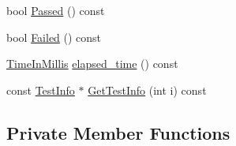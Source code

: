 \begin{DoxyCompactItemize}
\item 
bool \hyperlink{classtesting_1_1TestCase_ac97d5073365af8a73262fd9f6bf18656}{\-Passed} () const 
\item 
bool \hyperlink{classtesting_1_1TestCase_a7cf078354304c964c1934f53bf2bb4d7}{\-Failed} () const 
\item 
\hyperlink{namespacetesting_a338e9fd9474f0d8fafcb28b05f66a630}{\-Time\-In\-Millis} \hyperlink{classtesting_1_1TestCase_a4f91886b546ea9cc5ba2d374a62f3a9c}{elapsed\-\_\-time} () const 
\item 
const \hyperlink{classtesting_1_1TestInfo}{\-Test\-Info} $\ast$ \hyperlink{classtesting_1_1TestCase_ad2a7e943688a31c1db24b59c82076005}{\-Get\-Test\-Info} (int i) const 
\end{DoxyCompactItemize}
\subsection*{\-Private \-Member \-Functions}

